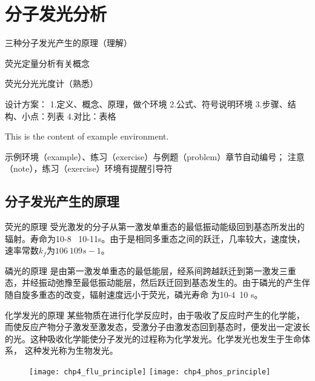 \chapter{分子发光分析}

\begin{introduction}
	\item 三种分子发光产生的原理（理解）
	\item 荧光定量分析有关概念
	\item 荧光分光光度计（熟悉）
\end{introduction}


设计方案：
1.定义、概念、原理，做个环境
2.公式、符号说明环境
3.步骤、结构、小点：列表
4.对比：表格

\begin{exercise}
	This is the content of example environment.
\end{exercise}

示例环境（example）、练习（exercise）与例题（problem）章节自动编号；
注意（note），练习（exercise）环境有提醒引导符

\section{分子发光产生的原理}

\begin{emptytcb*}{荧光的原理}{}
	受光激发的分子从第一激发单重态的最低振动能级回到基态所发出的辐射。寿命为10-8~ 10-11s。由于是相同多重态之间的跃迁，几率较大，速度快，速率常数$k_f$为$106~109 s-1$。
\end{emptytcb*}

\begin{emptytcb*}{磷光的原理}{}
	是由第一激发单重态的最低能层，经系间跨越跃迁到第一激发三重态，并经振动弛豫至最低振动能层，然后跃迁回到基态发生的。由于磷光的产生伴随自旋多重态的改变，辐射速度远小于荧光，磷光寿命 为10-4~10 s。
\end{emptytcb*}

\begin{emptytcb*}{化学发光的原理}{}
	 某些物质在进行化学反应时，由于吸收了反应时产生的化学能，而使反应产物分子激发至激发态，受激分子由激发态回到基态时，便发出一定波长的光。这种吸收化学能使分子发光的过程称为化学发光。化学发光也发生于生命体系， 这种发光称为生物发光。
\end{emptytcb*}

\begin{figure}
	\centering
	\texttt{[image: chp4\_flu\_principle]}
	\label{fig:chp4fluprinciple}
	\texttt{[image: chp4\_phos\_principle]}
	\label{fig:chp4phosprinciple}
	\caption{}
\end{figure}



